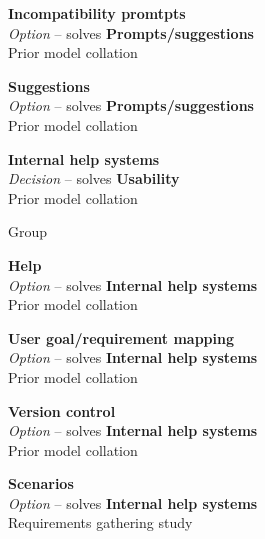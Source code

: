 \textbf{Incompatibility promtpts} \\ \emph{Option} -- solves \textbf{Prompts/suggestions} \\ Prior model collation \cite{Minhas2012}


\textbf{Suggestions} \\ \emph{Option} -- solves \textbf{Prompts/suggestions} \\ Prior model collation \cite{Minhas2012}

\textbf{Internal help systems} \\ \emph{Decision} -- solves \textbf{Usability} \\ Prior model collation

Group

\textbf{Help} \\ \emph{Option} -- solves \textbf{Internal help systems} \\ Prior model collation \cite{Grammel2010}

\textbf{User goal/requirement mapping} \\ \emph{Option} -- solves \textbf{Internal help systems} \\ Prior model collation \cite{Minhas2012}


\textbf{Version control} \\ \emph{Option} -- solves \textbf{Internal help systems} \\ Prior model collation \cite{Grammel2010}

\textbf{Scenarios} \\ \emph{Option} -- solves \textbf{Internal help systems} \\ Requirements gathering study


